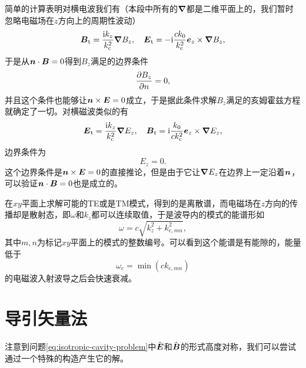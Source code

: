 简单的计算表明对横电波我们有（本段中所有的$\grad$都是二维平面上的，我们暂时忽略电磁场在$z$方向上的周期性波动）
\begin{equation}
    \vb*{B}_\text{t} = \frac{\mathrm{i} k_z}{k_\text{c}^2} \grad{B_z}, \quad \vb*{E}_\text{t} = - \mathrm{i} \frac{c k_0}{k_\text{c}^2} \vb*{e}_z \times \grad{B_z},
\end{equation}
于是从$\vb*{n} \cdot \vb*{B} = 0$得到$B_z$满足的边界条件
\begin{equation}
    \pdv{B_z}{n} = 0,
\end{equation}
并且这个条件也能够让$\vb*{n} \times \vb*{E} = 0$成立，于是据此条件求解$B_z$满足的亥姆霍兹方程就确定了一切。对横磁波类似的有
\begin{equation}
    \vb*{E}_\text{t} = \frac{\mathrm{i} k_z}{k_\text{c}^2} \grad{E_z}, \quad \vb*{B}_\text{t} = \mathrm{i} \frac{k_0}{ck_\text{c}^2} \vb*{e}_z \times \grad{E_z},
\end{equation}
边界条件为
\begin{equation}
    E_z = 0.
\end{equation}
这个边界条件是$\vb*{n} \times \vb*{E}=0$的直接推论，但是由于它让$\grad{E_z}$在边界上一定沿着$\vb*{n}$，可以验证$\vb*{n} \cdot \vb*{B}=0$也是成立的。

在$xy$平面上求解可能的TE或是TM模式，得到的是离散谱，而电磁场在$z$方向的传播却是散射态，即$\omega$和$k_z$都可以连续取值，于是波导内的模式的能谱形如
\begin{equation}
    \omega = c \sqrt{k_z^2 + k_{\text{c}, mn}^2},
\end{equation}
其中$m, n$为标记$xy$平面上的模式的整数编号。可以看到这个能谱是有能隙的，能量低于
\begin{equation}
    \omega_\text{c} = \min (c k_{\text{c}, mn})
\end{equation}
的电磁波入射波导之后会快速衰减。

\section{导引矢量法}\label{sec:guiding-vector}

注意到问题\eqref{eq:isotropic-cavity-problem}中$\tilde{\vb*{E}}$和$\tilde{\vb*{B}}$的形式高度对称，我们可以尝试通过一个特殊的构造产生它的解。

